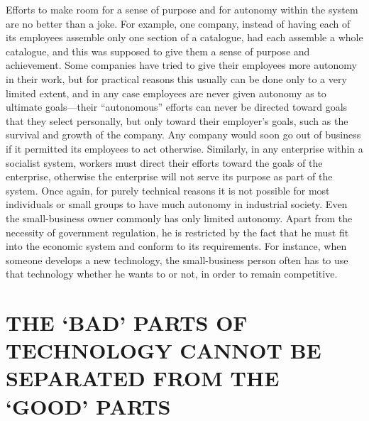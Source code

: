  Efforts to make room for a sense of purpose and for autonomy within the system are no better than a joke. For example, one company, instead of having each of its employees assemble only one section of a catalogue, had each assemble a whole catalogue, and this was supposed to give them a sense of purpose and achievement. Some companies have tried to give their employees more autonomy in their work, but for practical reasons this usually can be done only to a very limited extent, and in any case employees are never given autonomy as to ultimate goals—their “autonomous” efforts can never be directed toward goals that they select personally, but only toward their employer’s goals, such as the survival and growth of the company. Any company would soon go out of business if it permitted its employees to act otherwise. Similarly, in any enterprise within a socialist system, workers must direct their efforts toward the goals of the enterprise, otherwise the enterprise will not serve its purpose as part of the system. Once again, for purely technical reasons it is not possible for most individuals or small groups to have much autonomy in industrial society. Even the small-business owner commonly has only limited autonomy. Apart from the necessity of government regulation, he is restricted by the fact that he must fit into the economic system and conform to its requirements. For instance, when someone develops a new technology, the small-business person often has to use that technology whether he wants to or not, in order to remain competitive.

\chapter{THE ‘BAD’ PARTS OF TECHNOLOGY CANNOT BE SEPARATED FROM THE ‘GOOD’ PARTS}


